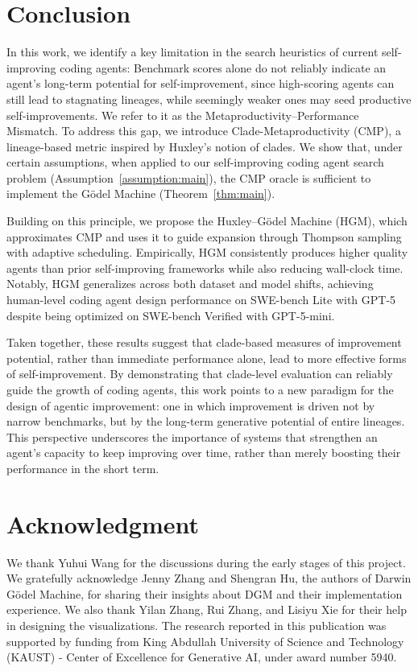 \documentclass{article}
\begin{document}
\section{Conclusion}
In this work, we identify a key limitation in the search heuristics of current self-improving coding agents: Benchmark scores alone do not reliably indicate an agent’s long-term potential for self-improvement, since high-scoring agents can still lead to stagnating lineages, while seemingly weaker ones may seed productive self-improvements. We refer to it as the Metaproductivity–Performance Mismatch. To address this gap, we introduce Clade-Metaproductivity ($\mathrm{CMP}$), a lineage-based metric inspired by Huxley’s notion of clades.
We show that, under certain assumptions, when applied to our self-improving coding agent search problem (Assumption~\ref{assumption:main}), the $\mathrm{CMP}$ oracle is sufficient to implement the G\"odel Machine (Theorem~\ref{thm:main}).

Building on this principle, we propose the Huxley–G\"odel Machine (HGM), which approximates $\mathrm{CMP}$ and uses it to guide expansion through Thompson sampling with adaptive scheduling. Empirically, HGM consistently produces higher quality agents than prior self-improving frameworks while also reducing wall-clock time. Notably, HGM generalizes across both dataset and model shifts, achieving human-level coding agent design performance on SWE-bench Lite with GPT-5 despite being optimized on SWE-bench Verified with GPT-5-mini.

Taken together, these results suggest that clade-based measures of improvement potential, rather than immediate performance alone, lead to more effective forms of self-improvement. By demonstrating that clade-level evaluation can reliably guide the growth of coding agents, this work points to a new paradigm for the design of agentic improvement: one in which improvement is driven not by narrow benchmarks, but by the long-term generative potential of entire lineages. This perspective underscores the importance of systems that strengthen an agent’s capacity to keep improving over time, rather than merely boosting their performance in the short term.

\section*{Acknowledgment}
We thank Yuhui Wang for the discussions during the early stages of this project. We gratefully acknowledge Jenny Zhang and Shengran Hu, the authors of Darwin G\"odel Machine, for sharing their insights about DGM and their implementation experience. We also thank Yilan Zhang, Rui Zhang, and Lisiyu Xie for their help in designing the visualizations.
The research reported in this publication was supported by funding from King Abdullah University of Science and Technology (KAUST) - Center of Excellence for Generative AI, under award number 5940.
\end{document}
